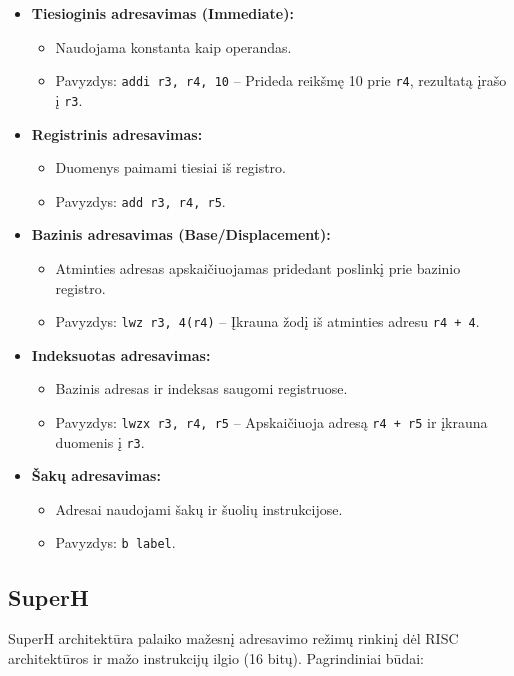 \documentclass{article}
\begin{document}
\begin{itemize}
    \item \textbf{Tiesioginis adresavimas (Immediate):}
        \begin{itemize}
            \item Naudojama konstanta kaip operandas.
            \item Pavyzdys: \texttt{addi r3, r4, 10} – Prideda reikšmę 10 prie \texttt{r4}, rezultatą įrašo į \texttt{r3}.
        \end{itemize}
    \item \textbf{Registrinis adresavimas:}
        \begin{itemize}
            \item Duomenys paimami tiesiai iš registro.
            \item Pavyzdys: \texttt{add r3, r4, r5}.
        \end{itemize}
    \item \textbf{Bazinis adresavimas (Base/Displacement):}
        \begin{itemize}
            \item Atminties adresas apskaičiuojamas pridedant poslinkį prie bazinio registro.
            \item Pavyzdys: \texttt{lwz r3, 4(r4)} – Įkrauna žodį iš atminties adresu \texttt{r4 + 4}.
        \end{itemize}
    \item \textbf{Indeksuotas adresavimas:}
        \begin{itemize}
            \item Bazinis adresas ir indeksas saugomi registruose.
            \item Pavyzdys: \texttt{lwzx r3, r4, r5} – Apskaičiuoja adresą \texttt{r4 + r5} ir įkrauna duomenis į \texttt{r3}.
        \end{itemize}
    \item \textbf{Šakų adresavimas:}
        \begin{itemize}
            \item Adresai naudojami šakų ir šuolių instrukcijose.
            \item Pavyzdys: \texttt{b label}.
        \end{itemize}
\end{itemize}

\subsection{SuperH}
SuperH architektūra palaiko mažesnį adresavimo režimų rinkinį dėl RISC architektūros ir mažo instrukcijų ilgio (16 bitų). Pagrindiniai būdai:
\end{document}
